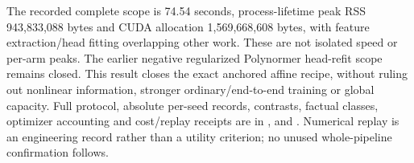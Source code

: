 The recorded complete scope is 74.54 seconds, process-lifetime peak RSS 943,833,088 bytes and CUDA allocation 1,569,668,608 bytes, with feature extraction/head fitting overlapping other work. These are not isolated speed or per-arm peaks. The earlier negative regularized Polynormer head-refit scope remains closed. This result closes the exact anchored affine recipe, without ruling out nonlinear information, stronger ordinary/end-to-end training or global capacity. Full protocol, absolute per-seed records, contrasts, factual classes, optimizer accounting and cost/replay receipts are in ,  and . Numerical replay is an engineering record rather than a utility criterion; no unused whole-pipeline confirmation follows.
